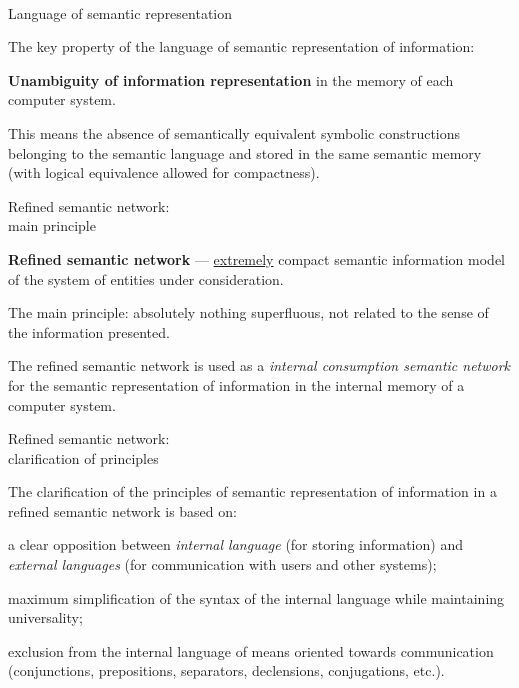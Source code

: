 \begin{frame}{\\Language of semantic representation}
	\topline
	\justifying
	
	The key property of the language of semantic representation of information:
	\begin{textitemize}
		\item \textbf{Unambiguity of information representation} in the memory of each computer system.
	\end{textitemize}
	
	\medskip
	This means the absence of semantically equivalent symbolic constructions belonging to the semantic language and stored in the same semantic memory (with logical equivalence allowed for compactness).
	
\end{frame}


\begin{frame}{Refined semantic network:\\main principle}
	\topline
	\justifying
	
	\textbf{Refined semantic network} ---
	\uline{extremely} compact semantic information model of the system of entities under consideration.
	
	\medskip
	The main principle: absolutely nothing superfluous, not related to the sense of the information presented.
	
	\medskip
	The refined semantic network is used as a \textit{internal consumption semantic network} for the semantic representation of information in the internal memory of a computer system.
	
\end{frame}


\begin{frame}{Refined semantic network:\\clarification of principles}
	\topline
	\justifying
	
	The clarification of the principles of semantic representation of information in a refined semantic network is based on:
	\begin{textitemize}
		\item a clear opposition between \textit{internal language} (for storing information) and \textit{external languages} (for communication with users and other systems);
		\item maximum simplification of the syntax of the internal language while maintaining universality;
		\item exclusion from the internal language of means oriented towards communication (conjunctions, prepositions, separators, declensions, conjugations, etc.).
	\end{textitemize}
	
\end{frame}


